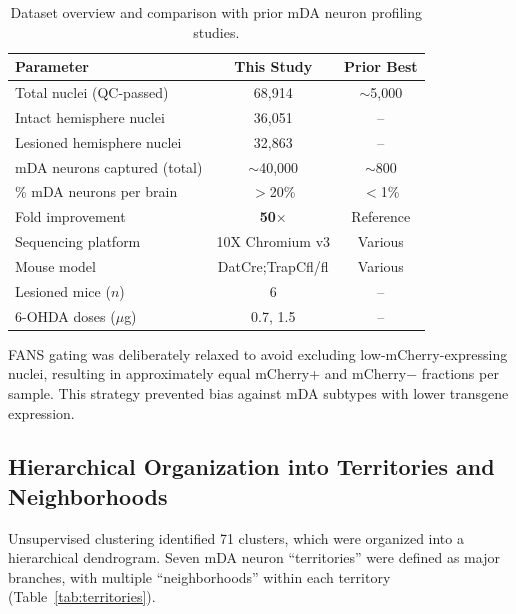 \documentclass[11pt]{article}
\begin{document}
\begin{table}[H]
\centering
\caption{Dataset overview and comparison with prior mDA neuron profiling studies.}
\label{tab:dataset}
\begin{tabular}{lcc}
\toprule
Parameter & This Study & Prior Best \\
\midrule
Total nuclei (QC-passed) & 68,914 & $\sim$5,000 \\
Intact hemisphere nuclei & 36,051 & -- \\
Lesioned hemisphere nuclei & 32,863 & -- \\
mDA neurons captured (total) & $\sim$40,000 & $\sim$800 \\
\% mDA neurons per brain & $>$20\% & $<$1\% \\
Fold improvement & \textbf{50$\times$} & Reference \\
Sequencing platform & 10X Chromium v3 & Various \\
Mouse model & DatCre;TrapCfl/fl & Various \\
Lesioned mice ($n$) & 6 & -- \\
6-OHDA doses ($\mu$g) & 0.7, 1.5 & -- \\
\bottomrule
\end{tabular}
\end{table}

FANS gating was deliberately relaxed to avoid excluding low-mCherry-expressing nuclei, resulting in approximately equal mCherry+ and mCherry$-$ fractions per sample. This strategy prevented bias against mDA subtypes with lower transgene expression.

\subsection{Hierarchical Organization into Territories and Neighborhoods}

Unsupervised clustering identified 71 clusters, which were organized into a hierarchical dendrogram. Seven mDA neuron ``territories'' were defined as major branches, with multiple ``neighborhoods'' within each territory (Table~\ref{tab:territories}).
\end{document}
